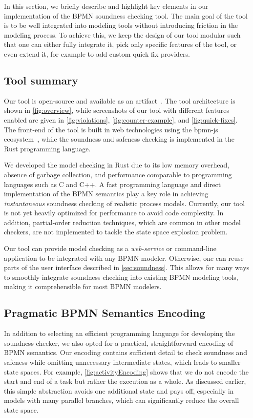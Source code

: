 \documentclass[runningheads]{llncs}
\begin{document}
In this section, we briefly describe and highlight key elements in our implementation of the BPMN soundness checking tool.
The main goal of the tool is to be well integrated into modeling tools without introducing friction in the modeling process.
To achieve this, we keep the design of our tool modular such that one can either fully integrate it, pick only specific features of the tool, or even extend it, for example to add custom quick fix providers.

\subsection{Tool summary}
Our tool is open-source and available as an artifact~\cite{noauthorgivenBPM2024Artifacts2024}.
The tool architecture is shown in \autoref{fig:overview}, while screenshots of our tool with different features enabled are given in \autoref{fig:violations}, \autoref{fig:counter-example}, and \autoref{fig:quick-fixes}.
The front-end of the tool is built in web technologies using the bpmn-js ecosystem~\cite{camundaservicesgmbhBpmnjsTokenSimulation2024}, while the soundness and safeness checking is implemented in the Rust programming language.

We developed the model checking in Rust due to its low memory overhead, absence of garbage collection, and performance comparable to programming languages such as C and C++.
A fast programming language and direct implementation of the BPMN semantics play a key role in achieving \textit{instantaneous} soundness checking of realistic process models.
Currently, our tool is not yet heavily optimized for performance to avoid code complexity.
In addition, partial-order reduction techniques, which are common in other model checkers, are not implemented to tackle the state space explosion problem.

Our tool can provide model checking as a \textit{web-service} or command-line application to be integrated with any BPMN modeler.
Otherwise, one can reuse parts of the user interface described in \autoref{sec:soundness}.
This allows for many ways to smoothly integrate soundness checking into existing BPMN modeling tools, making it comprehensible for most BPMN modelers.

\subsection{Pragmatic BPMN Semantics Encoding}
In addition to selecting an efficient programming language for developing the soundness checker, we also opted for a practical, straightforward encoding of BPMN semantics.
Our encoding contains sufficient detail to check soundness and safeness while omitting unnecessary intermediate states, which leads to smaller state spaces.
For example, \autoref{fig:activityEncoding} shows that we do not encode the start and end of a task but rather the execution as a whole.
As discussed earlier, this simple abstraction avoids one additional state and pays off, especially in models with many parallel branches, which can significantly reduce the overall state space.
\end{document}
